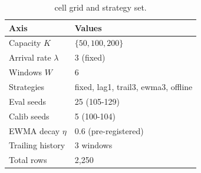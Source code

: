 \begin{table}[!t]
 \caption{cell grid and strategy set.}
 \label{tab:grid}
 \centering
 \small
 \setlength{\tabcolsep}{4pt}
 \begin{tabular}{@{}p{2.6cm}p{4.9cm}@{}}
 \toprule
 \textbf{Axis} & \textbf{Values} \\
 \midrule
 Capacity $K$ & $\{50, 100, 200\}$ \\
 Arrival rate $\lambda$ & 3 (fixed) \\
 Windows $W$ & 6 \\
 Strategies & fixed, lag1, trail3, ewma3, offline \\
 Eval seeds & 25 (105-129) \\
 Calib seeds & 5 (100-104) \\
 EWMA decay $\eta$ & 0.6 (pre-registered) \\
 Trailing history & 3 windows \\
 \midrule
 Total rows & 2{,}250 \\
 \bottomrule
 \end{tabular}
\end{table}
